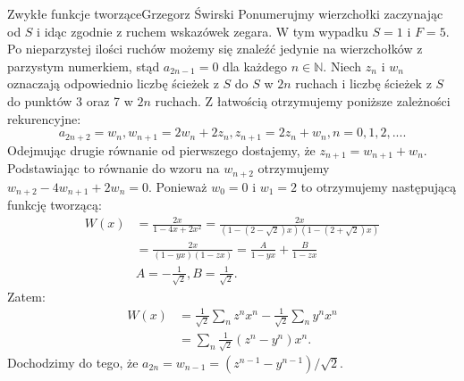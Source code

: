 \begin{referat}{Zwykłe funkcje tworzące}{Grzegorz Świrski}
Ponumerujmy wierzchołki zaczynając od $S$ i idąc zgodnie
z ruchem wskazówek zegara. W tym wypadku $S = 1$ i $F = 5$. Po nieparzystej
ilości ruchów możemy się znaleźć jedynie na wierzchołków z parzystym numerkiem, stąd
$a_{2n-1} = 0$ dla każdego $n \in \mathbb{N}$. Niech $z_n$ i $w_n$ oznaczają odpowiednio
liczbę ścieżek z $S$ do $S$ w $2n$ ruchach i liczbę ścieżek z $S$ do punktów 3 oraz 7 w $2n$
ruchach. Z łatwością otrzymujemy poniższe zależności rekurencyjne:
$$a_{2n+2} = w_n, w_{n+1} = 2w_n + 2z_n, z_{n+1} = 2z_n + w_n, n = 0,1,2,... .$$
Odejmując drugie równanie od pierwszego dostajemy, że $z_{n+1} = w_{n+1} + w_n$.
Podstawiając to równanie do wzoru na $w_{n+2}$ otrzymujemy $w_{n+2} - 4w_{n+1} + 2w_n = 0$.
Ponieważ $w_0 = 0$ i $w_1 = 2$ to otrzymujemy następującą funkcję tworzącą:
\begin{align*}
  W(x) &= \frac{2x}{1-4x+2x^2} = \frac{2x}{(1-(2-\sqrt{2})x)(1-(2+\sqrt{2})x)} \\
       &= \frac{2x}{(1-yx)(1-zx)} = \frac{A}{1-yx} + \frac{B}{1-zx} \\
       &A = - \frac{1}{\sqrt{2}}, B = \frac{1}{\sqrt{2}}.
\end{align*}
Zatem:
\begin{align*}
  W(x) &= \frac{1}{\sqrt{2}} \sum_n z^n x^n - \frac{1}{\sqrt{2}} \sum_n y^n x^n \\
       &= \sum_n \frac{1}{\sqrt{2}} (z^n - y^n)x^n.
\end{align*}
Dochodzimy do tego, że $a_{2n} = w_{n-1} = (z^{n-1} - y^{n-1}) / \sqrt{2}$.

\end{referat}
